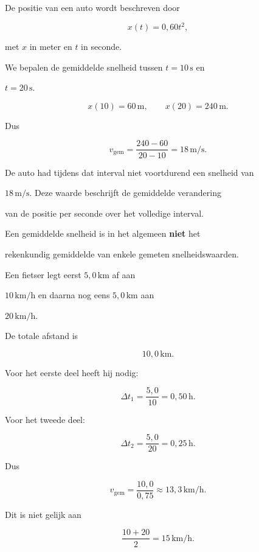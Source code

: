 \documentclass{ximera}
\begin{document}
\begin{voorbeeld}

De positie van een auto wordt beschreven door

\[x(t)=0,60t^2,\]

met $x$ in meter en $t$ in seconde.

We bepalen de gemiddelde snelheid tussen $t=10\,\mathrm{s}$ en

$t=20\,\mathrm{s}$.

\[x(10)=60\,\mathrm{m}, \qquad x(20)=240\,\mathrm{m}.\]

Dus

\[v_{\mathrm{gem}} = \frac{240-60}{20-10} = 18\,\mathrm{m/s}.\]

De auto had tijdens dat interval niet voortdurend een snelheid van

$18\,\mathrm{m/s}$. Deze waarde beschrijft de gemiddelde verandering

van de positie per seconde over het volledige interval.

\end{voorbeeld}


Een gemiddelde snelheid is in het algemeen \textbf{niet} het

rekenkundig gemiddelde van enkele gemeten snelheidswaarden.

\begin{voorbeeld}

Een fietser legt eerst $5,0\,\mathrm{km}$ af aan

$10\,\mathrm{km/h}$ en daarna nog eens $5,0\,\mathrm{km}$ aan

$20\,\mathrm{km/h}$.

De totale afstand is

\[10,0\,\mathrm{km}.\]

Voor het eerste deel heeft hij nodig:

\[\Delta t_1=\frac{5,0}{10}=0,50\,\mathrm{h}.\]

Voor het tweede deel:

\[\Delta t_2=\frac{5,0}{20}=0,25\,\mathrm{h}.\]

Dus

\[v_{\mathrm{gem}} = \frac{10,0}{0,75} \approx 13,3\,\mathrm{km/h}.\]

Dit is niet gelijk aan

\[\frac{10+20}{2}=15\,\mathrm{km/h}.\]

\end{voorbeeld}
\end{document}
